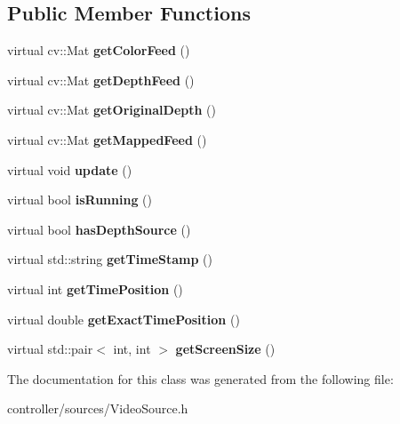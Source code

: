 \subsection*{Public Member Functions}
\begin{DoxyCompactItemize}
\item 
\mbox{\label{class_video_source_ae18f07760d917884b62d0da6ea2efaee}} 
virtual cv\+::\+Mat {\bfseries get\+Color\+Feed} ()
\item 
\mbox{\label{class_video_source_aba297efc2b09e3534490bf1d02eb84c3}} 
virtual cv\+::\+Mat {\bfseries get\+Depth\+Feed} ()
\item 
\mbox{\label{class_video_source_a9ee8f65394d627443b41f7765f20e20e}} 
virtual cv\+::\+Mat {\bfseries get\+Original\+Depth} ()
\item 
\mbox{\label{class_video_source_a96e2fde5f81c19163831070c34b6d2c8}} 
virtual cv\+::\+Mat {\bfseries get\+Mapped\+Feed} ()
\item 
\mbox{\label{class_video_source_ab5090a635efeb4e8087ba57405f08f32}} 
virtual void {\bfseries update} ()
\item 
\mbox{\label{class_video_source_a6b15d80d574803453f5fec377de02bb4}} 
virtual bool {\bfseries is\+Running} ()
\item 
\mbox{\label{class_video_source_a5adefd9f8be29bb4e0dda8acfd8b7b34}} 
virtual bool {\bfseries has\+Depth\+Source} ()
\item 
\mbox{\label{class_video_source_a4afeab48c5bd2d1d2f07e6a2df0d28f5}} 
virtual std\+::string {\bfseries get\+Time\+Stamp} ()
\item 
\mbox{\label{class_video_source_a99713fa4a77b086b70c5383966288ab9}} 
virtual int {\bfseries get\+Time\+Position} ()
\item 
\mbox{\label{class_video_source_a8f9438a3d5a1599d330bc4bfe1610984}} 
virtual double {\bfseries get\+Exact\+Time\+Position} ()
\item 
\mbox{\label{class_video_source_a47b9dfa3b2719769e514f3360cabb84d}} 
virtual std\+::pair$<$ int, int $>$ {\bfseries get\+Screen\+Size} ()
\end{DoxyCompactItemize}


The documentation for this class was generated from the following file\+:\begin{DoxyCompactItemize}
\item 
controller/sources/Video\+Source.\+h\end{DoxyCompactItemize}
